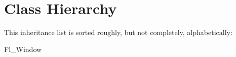 \section{Class Hierarchy}
This inheritance list is sorted roughly, but not completely, alphabetically\+:\begin{DoxyCompactList}
\item Fl\+\_\+\+Window\begin{DoxyCompactList}
\item {}
\end{DoxyCompactList}
\end{DoxyCompactList}
